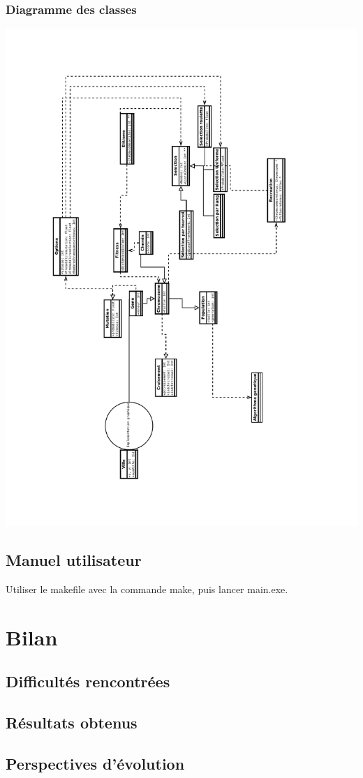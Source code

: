 \documentclass{report}
\begin{document}
\subsection{Diagramme des classes}
	\includegraphics[scale=0.6, angle=270]{../Classes_UML.pdf}
\section{Manuel utilisateur}
Utiliser le makefile avec la commande make, puis lancer main.exe.
\chapter{Bilan}
\section{Difficultés rencontrées}

\section{Résultats obtenus}

\section{Perspectives d'évolution}
\end{document}
